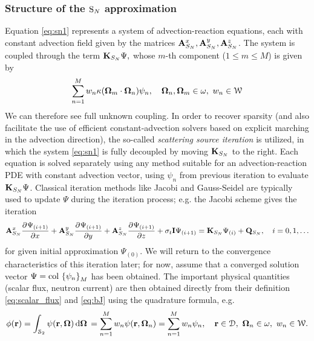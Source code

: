 \subsubsection{Structure of the $\text{S}_{N}$ approximation}
Equation \eqref{eq:sn1} represents a system of advection-reaction equations, each with constant advection field given by
the matrices $\mathbf{A}_{S_N}^x, \mathbf{A}_{S_N}^y, \mathbf{A}_{S_N}^z$.  The system is coupled through the term
$
	\mathbf{K}_{S_N}\Psi,
$
whose $m$-th component ($1 \leq m \leq M$) is given by
$$
\sum_{n=1}^{M} w_n \kappa(\bomega_m\cdot\bomega_n) \psi_n,\quad \bomega_n,\bomega_m\in \omega,\ 
	w_n\in \mathcal{W}
$$
We can therefore see full unknown coupling. In order to recover sparsity (and also facilitate the use of efficient
constant-advection solvers based on explicit marching in the advection direction), the so-called  \textit{scattering
source iteration} is utilized, in which the system \eqref{eq:sn1} is fully decoupled by moving $\mathbf{K}_{S_N}$ to the
right. Each equation is solved separately using any method suitable for an advection-reaction PDE with constant
advection vector, using $\psi_n$ from previous iteration to evaluate $\mathbf{K}_{S_N}\Psi$. Classical iteration methods
like Jacobi and Gauss-Seidel are typically used to update $\Psi$ during the iteration process; e.g. the Jacobi scheme 
gives the iteration
\begin{equation}\label{eq:SI}
	\mathbf{A}_{S_N}^x\frac{\partial^{}\Psi_{(i+1)}}{\partial x^{}} + \mathbf{A}_{S_N}^y\frac{\partial^{}\Psi_{(i+1)}}{\partial y^{}} +
	\mathbf{A}_{S_N}^z\frac{\partial^{}\Psi_{(i+1)}}{\partial z^{}} + \sigma_t\mathbf{I}\Psi_{(i+1)}= \mathbf{K}_{S_N}\Psi_{(i)} +
	\mathbf{Q}_{S_N},\quad
	i = 0,1,\ldots
\end{equation}
for given initial approximation $\Psi_{(0)}$. We will return to the convergence characteristics of this iteration later;
for now, assume that a converged solution vector $\Psi = \operatorname{col\,}\left\{\psi_n\right\}_{M}$ has been obtained. The important physical
quantities (scalar flux, neutron current) are then obtained directly from their definition \eqref{eq:scalar_flux} and \eqref{eq:bJ} using
the quadrature formula, e.g.
$$
	\phi(\mathbf{r}) = \int_{\mathcal{S}_2}\psi(\mathbf{r},\mathbf{\Omega})\,\text{d}\mathbf{\Omega}\, = \sum_{n=1}^{M} w_n \psi(\mathbf{r},\mathbf{\Omega}_n) = \sum_{n=1}^{M} w_n \psi_n, \quad \mathbf{r}\in
	\mathcal{D},\ \mathbf{\Omega}_n\in \omega,\ w_n\in \mathcal{W}.
$$

